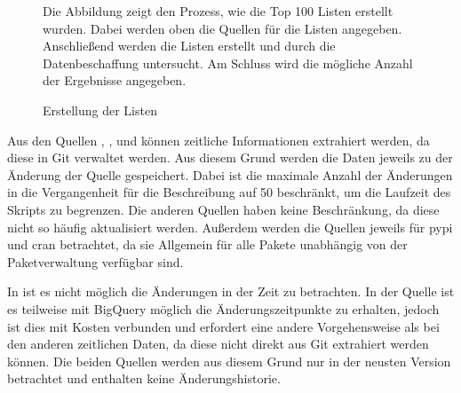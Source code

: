 \begin{figure}
    \centering
    
    \caption{Erstellung der Listen}
    \label{fig:erstellung_listen}
    \small
    \raggedright
    Die Abbildung zeigt den Prozess, wie die Top 100 Listen erstellt wurden. Dabei werden oben die Quellen für die Listen angegeben. Anschließend werden die Listen erstellt und durch die Datenbeschaffung untersucht. Am Schluss wird die mögliche Anzahl der Ergebnisse angegeben.
\end{figure}

Aus den Quellen , ,  und  können zeitliche Informationen extrahiert werden, da diese in Git verwaltet werden.
Aus diesem Grund werden die Daten jeweils zu der Änderung der Quelle gespeichert.
Dabei ist die maximale Anzahl der Änderungen in die Vergangenheit für die Beschreibung auf 50 beschränkt, um die Laufzeit des Skripts zu begrenzen.
Die anderen Quellen haben keine Beschränkung, da diese nicht so häufig aktualisiert werden.
Außerdem werden die Quellen jeweils für \gls{pypi} und \gls{cran} betrachtet, da sie Allgemein für alle Pakete unabhängig von der Paketverwaltung verfügbar sind.

In  ist es nicht möglich die Änderungen in der Zeit zu betrachten.
In der  Quelle ist es teilweise mit BigQuery möglich die Änderungszeitpunkte zu erhalten, jedoch ist dies mit Kosten verbunden und erfordert eine andere Vorgehensweise als bei den anderen zeitlichen Daten, da diese nicht direkt aus Git extrahiert werden können.
Die beiden Quellen werden aus diesem Grund nur in der neusten Version betrachtet und enthalten keine Änderungshistorie.







